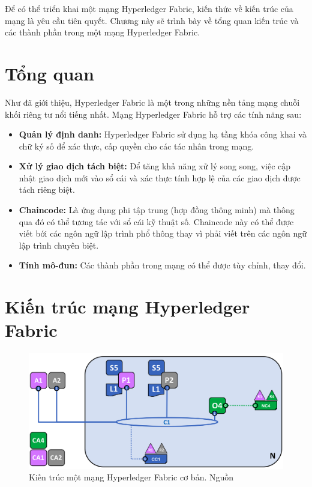 \documentclass[../DoAn.tex]{subfiles}
\begin{document}
Để có thể triển khai một mạng Hyperledger Fabric, kiến thức về kiến trúc của mạng là yêu cầu tiên quyết. Chương này sẽ trình bày về tổng quan kiến trúc và các thành phần trong một mạng Hyperledger Fabric.

\section{Tổng quan}

Như đã giới thiệu, Hyperledger Fabric là một trong những nền tảng mạng chuỗi khối riêng tư nổi tiếng nhất. Mạng Hyperledger Fabric hỗ trợ các tính năng sau:
\begin{itemize}
  \item \textbf{Quản lý định danh:} Hyperledger Fabric sử dụng hạ tầng khóa công khai và chữ ký số để xác thực, cấp quyền cho các tác nhân trong mạng.
  \item \textbf{Xử lý giao dịch tách biệt:} Để tăng khả năng xử lý song song, việc cập nhật giao dịch mới vào sổ cái và xác thực tính hợp lệ của các giao dịch được tách riêng biệt.
  \item \textbf{Chaincode:} Là ứng dụng phi tập trung (hợp đồng thông minh) mà thông qua đó có thể tương tác với sổ cái kỹ thuật số. Chaincode này có thể được viết bới các ngôn ngữ lập trình phổ thông thay vì phải viết trên các ngôn ngữ lập trình chuyên biệt.
  \item \textbf{Tính mô-đun:} Các thành phần trong mạng có thể được tùy chỉnh, thay đổi.
\end{itemize}

\section{Kiến trúc mạng Hyperledger Fabric}
\begin{figure}[h]
  \centering
  \includegraphics[width=0.7\linewidth]{Hinhve/network.diagram.7.png}
  \caption[Kiến trúc một mạng Hyperledger Fabric cơ bản]{Kiến trúc một mạng Hyperledger Fabric cơ bản. Nguồn \cite{fabric_architecture}}
  \label{fig:fabric_architecture}
\end{figure}
\end{document}
